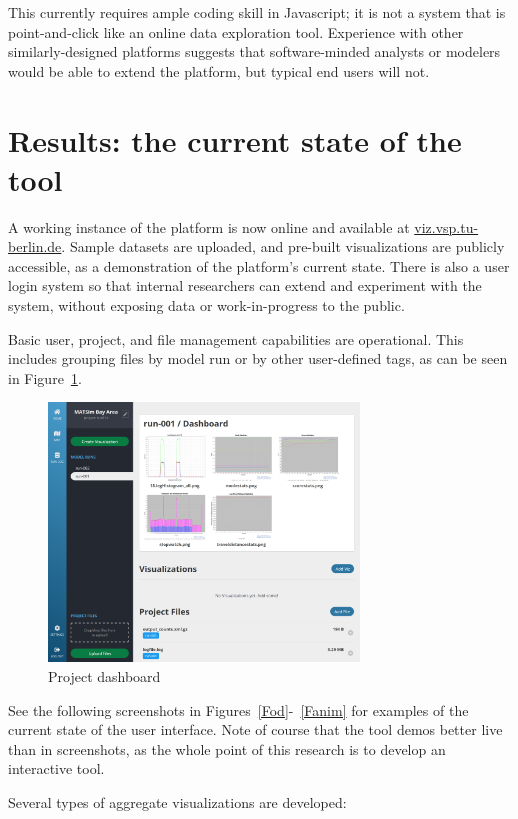 \documentclass[Afour,sagev,times]{sagej}
\begin{document}
This currently requires ample coding skill in Javascript; it is not a system that is point-and-click like an online data exploration tool. Experience with other similarly-designed platforms suggests that software-minded analysts or modelers would be able to extend the platform, but typical end users will not.

\section{Results: the current state of the tool}

A working instance of the platform is now online and available at \url{viz.vsp.tu-berlin.de}. Sample datasets are uploaded, and pre-built visualizations are publicly accessible, as a demonstration of the platform's current state. There is also a user login system so that internal researchers can extend and experiment with the system, without exposing data or work-in-progress to the public.

Basic user, project, and file management capabilities are operational. This includes grouping files by model run or by other user-defined tags, as can be seen in Figure~\ref{F1}.

\begin{figure}
\centering
\includegraphics[width=3.25in]{fig-dashboard.png}
\caption{Project dashboard}\label{F1}
\end{figure}

See the following screenshots in Figures~\ref{Fod}-~\ref{Fanim} for examples of the current state of the user interface. Note of course that the tool demos better live than in screenshots, as the whole point of this research is to develop an interactive tool.

Several types of aggregate visualizations are developed:
\end{document}
